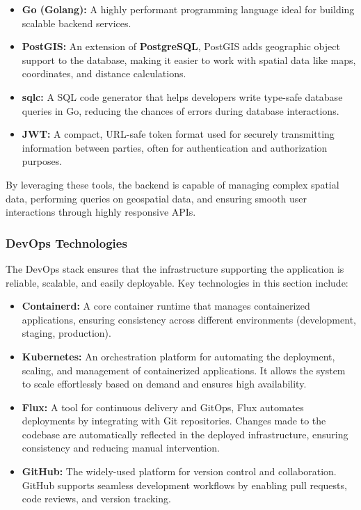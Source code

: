 \begin{itemize}
    \item{} \textbf{Go (Golang):} A highly performant programming language ideal for building scalable backend services.
    \item{} \textbf{PostGIS:}  An extension of \textbf{PostgreSQL}, PostGIS adds geographic object support to the database, making it easier to work with spatial data like maps, coordinates, and distance calculations.
    \item{} \textbf{sqlc:} A SQL code generator that helps developers write type{-}safe database queries in Go, reducing the chances of errors during database interactions.
    \item{} \textbf{JWT:} A compact, URL{-}safe token format used for securely transmitting information between parties, often for authentication and authorization purposes.
\end{itemize}

By leveraging these tools, the backend is capable of managing complex spatial data, performing queries on geospatial data, and ensuring smooth user interactions through highly responsive APIs.

\newpage{}

\subsubsection{DevOps Technologies}

The DevOps stack ensures that the infrastructure supporting the application is reliable, scalable, and easily deployable. Key technologies in this section include:

\begin{itemize}
    \item{}  \textbf{Containerd:} A core container runtime that manages containerized applications, ensuring consistency across different environments (development, staging, production).
    \item{} \textbf{Kubernetes:} An orchestration platform for automating the deployment, scaling, and management of containerized applications. It allows the system to scale effortlessly based on demand and ensures high availability.
    \item{} \textbf{Flux:} A tool for continuous delivery and GitOps, Flux automates deployments by integrating with Git repositories. Changes made to the codebase are automatically reflected in the deployed infrastructure, ensuring consistency and reducing manual intervention.
    \item{} \textbf{GitHub:} The widely{-}used platform for version control and collaboration. GitHub supports seamless development workflows by enabling pull requests, code reviews, and version tracking.
\end{itemize}

